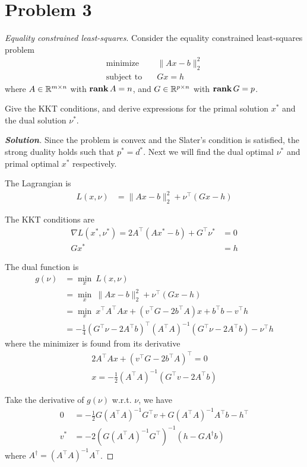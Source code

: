 \documentclass[11pt]{article}
\newenvironment{solution}
  {\renewcommand\qedsymbol{$\square$}\begin{proof}[\textbf{Solution}]}
  {\end{proof}}
\newcommand{\grad}{\nabla}
\newcommand{\inv}{^{-1}}        %
\newcommand{\T}{^\top}          %
\begin{document}
\clearpage
\section*{Problem 3}
\textit{Equality constrained least-squares}. Consider the equality constrained least-squares problem
\begin{align*}
  \text{minimize} \quad & \|Ax - b\|^2_2\\
  \text{subject to} \quad & Gx = h
\end{align*}
where $A\in{{\mathbb{R}}}^{m\times n}$ with $\mathop{\textbf{rank}} A = n$, and $G \in{{\mathbb{R}}}^{p\times n}$ with $\mathop{\textbf{rank}} G = p$.

Give the KKT conditions, and derive expressions for the primal solution $x^*$ and the dual solution $\nu^*$.

\begin{solution}
Since the problem is convex and the Slater's condition is satisfied, the strong duality holds such that $p^* = d^*$. Next we will find the dual optimal $\nu^*$ and primal optimal $x^*$ respectively.

The Lagrangian is
\begin{align*}
  L(x, \nu) &= \|Ax - b\|_2^2 + \nu^\top (Gx - h)
\end{align*}

The KKT conditions are
\begin{align*}
  \grad L(x^*, \nu^*) = 2A\T (Ax^* - b) + G\T \nu^* &= 0\\
  Gx^* &= h
\end{align*}

The dual function is
\begin{align*}
    g(\nu) 
    &= \min_x\ L(x, \nu) \\
    &= \min_x\ \|Ax - b\|_2^2 + \nu^\top (Gx - h) \\
    &= \min_x\ x^\top A^\top A x + (v^\top G - 2 b^\top A) x + b^\top b - v^\top h\\
    &= -\frac{1}{4} (G\T \nu - 2A\T b)\T (A\T A)\inv (G\T \nu - 2A\T b) - \nu\T h
\end{align*}
where the minimizer is found from its derivative
\begin{align*}
2 A^\top A x + (v^\top G - 2 b^\top A)^\top = 0 \\
x = -\frac{1}{2} (A^\top A)^{-1} (G^\top v - 2 A^\top b)
\end{align*}

Take the derivative of $g(\nu)$ w.r.t. $\nu$, we have
\begin{align*}
    0 &= -\frac{1}{2} G (A\T A)^{-1} G^\top v + G (A\T A)^{-1} A^\top b - h^\top \\
    v^* &= -2 (G (A\T A)^{-1} G^\top)^{-1} (h - G A^\dagger b)
\end{align*}
where $A^\dagger = (A^\top A)^{-1} A^\top$. 


\end{solution}
\end{document}
